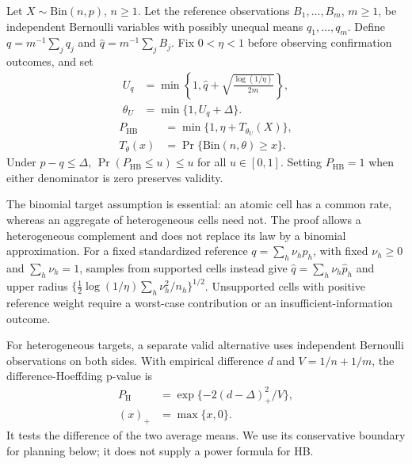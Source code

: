 \begin{proposition}
\label{prop:theory-hb}
Let $X\sim\mathrm{Bin}(n,p)$, $n\ge1$. Let the reference observations
$B_1,\ldots,B_m$, $m\ge1$, be independent Bernoulli variables with
possibly unequal means $q_1,\ldots,q_m$. Define
$q=m^{-1}\sum_jq_j$ and $\widehat q=m^{-1}\sum_j B_j$.
Fix $0<\eta<1$ before observing confirmation outcomes, and set
\begin{equation}
 \begin{aligned}
 U_q&=\min\left\{1,\widehat q+
          \sqrt{\frac{\log(1/\eta)}{2m}}\right\},\\
 \theta_U&=\min\{1,U_q+\Delta\}.
 \end{aligned}
 \label{eq:theory-upper-reference}
\end{equation}
\begin{equation}
 \begin{aligned}
 P_{\mathrm{HB}}&=\min\{1,\eta+T_{\theta_U}(X)\},\\
 T_\theta(x)&=\Pr\{\mathrm{Bin}(n,\theta)\ge x\}.
 \end{aligned}
 \label{eq:theory-hb}
\end{equation}
Under $p-q\le\Delta$, $\Pr(P_{\mathrm{HB}}\le u)\le u$ for all
$u\in[0,1]$. Setting $P_{\mathrm{HB}}=1$ when either denominator is zero
preserves validity.
\end{proposition}

The binomial target assumption is essential: an atomic cell has a common
rate, whereas an aggregate of heterogeneous cells need not. The proof
allows a heterogeneous complement and does not replace its law by a
binomial approximation. For a fixed standardized reference
$q=\sum_h\nu_hp_h$, with fixed $\nu_h\ge0$ and $\sum_h\nu_h=1$,
samples from supported cells instead give
$\widehat q=\sum_h\nu_h\widehat p_h$ and upper radius
$\{\frac12\log(1/\eta)\sum_h\nu_h^2/n_h\}^{1/2}$.
Unsupported cells with positive reference weight require a worst-case
contribution or an insufficient-information outcome.

For heterogeneous targets, a separate valid alternative uses independent
Bernoulli observations on both sides. With empirical difference $d$ and
$V=1/n+1/m$, the difference-Hoeffding p-value is
\begin{equation}
 \begin{aligned}
 P_{\mathrm H}&=\exp\{-2(d-\Delta)_+^2/V\},\\
 (x)_+&=\max\{x,0\}.
 \end{aligned}
 \label{eq:theory-hoeffding}
\end{equation}
It tests the difference of the two average means. We use its conservative
boundary for planning below; it does not supply a power formula for HB.

